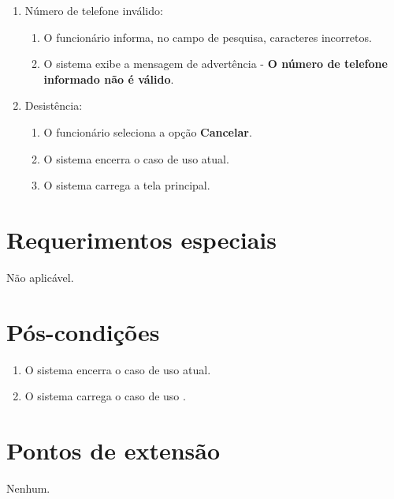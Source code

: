 \begin{enumerate}
	\item Número de telefone inválido:
	\begin{enumerate}
		\item O funcionário informa, no campo de pesquisa, caracteres incorretos.
		\item O sistema exibe a mensagem de advertência - \textbf{O número de telefone informado não é válido}.
	\end{enumerate}
	\item Desistência:
	\begin{enumerate}
		\item O funcionário seleciona a opção \textbf{Cancelar}.
		\item O sistema encerra o caso de uso atual.
		\item O sistema carrega a tela principal.
	\end{enumerate}
\end{enumerate}

\section{Requerimentos especiais}

Não aplicável.

\section{Pós-condições}

\begin{enumerate}
	\item O sistema encerra o caso de uso atual.
	\item O sistema carrega o caso de uso .
\end{enumerate}

\section{Pontos de extensão}

Nenhum.